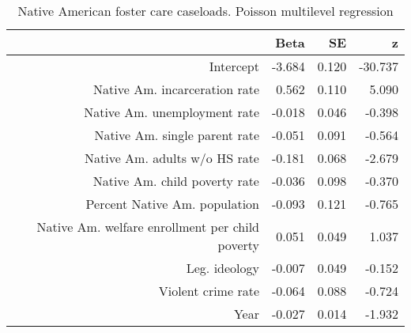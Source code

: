 \begin{table}[ht]
\centering
\begin{tabular}{rrrr}
  \hline
 & Beta & SE & z \\ 
  \hline
Intercept & -3.684 & 0.120 & -30.737 \\ 
  Native Am. incarceration rate & 0.562 & 0.110 & 5.090 \\ 
  Native Am. unemployment rate & -0.018 & 0.046 & -0.398 \\ 
  Native Am. single parent rate & -0.051 & 0.091 & -0.564 \\ 
  Native Am. adults w/o HS rate & -0.181 & 0.068 & -2.679 \\ 
  Native Am. child poverty rate & -0.036 & 0.098 & -0.370 \\ 
  Percent Native Am. population & -0.093 & 0.121 & -0.765 \\ 
  Native Am. welfare enrollment per child poverty & 0.051 & 0.049 & 1.037 \\ 
  Leg. ideology & -0.007 & 0.049 & -0.152 \\ 
  Violent crime rate & -0.064 & 0.088 & -0.724 \\ 
  Year & -0.027 & 0.014 & -1.932 \\ 
   \hline
\end{tabular}
\caption{Native American foster care caseloads. Poisson multilevel regression} 
\label{a.c.tab}
\end{table}
